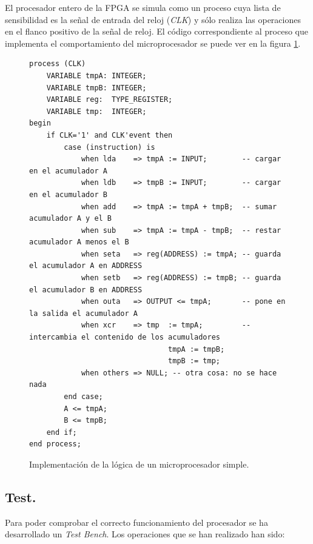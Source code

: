 \documentclass{article}
\begin{document}
El procesador entero de la FPGA se simula como un proceso cuya lista de sensibilidad es la señal de entrada del reloj (\emph{CLK}) y sólo realiza las operaciones en el flanco positivo de la señal de reloj. El código correspondiente al proceso que implementa el comportamiento del microprocesador se puede ver en la figura \ref{cod:p3:process}.

\begin{figure}[h]
	\begin{lstlisting}[style=vhdl]
process (CLK)
	VARIABLE tmpA: INTEGER;
	VARIABLE tmpB: INTEGER;
	VARIABLE reg:  TYPE_REGISTER;
	VARIABLE tmp:  INTEGER;
begin
	if CLK='1' and CLK'event then
		case (instruction) is
			when lda    => tmpA := INPUT;        -- cargar en el acumulador A
			when ldb    => tmpB := INPUT;        -- cargar en el acumulador B
			when add    => tmpA := tmpA + tmpB;  -- sumar acumulador A y el B
			when sub    => tmpA := tmpA - tmpB;  -- restar acumulador A menos el B
			when seta   => reg(ADDRESS) := tmpA; -- guarda el acumulador A en ADDRESS
			when setb   => reg(ADDRESS) := tmpB; -- guarda el acumulador B en ADDRESS
			when outa   => OUTPUT <= tmpA;       -- pone en la salida el acumulador A
			when xcr    => tmp  := tmpA;         -- intercambia el contenido de los acumuladores
								tmpA := tmpB;
								tmpB := tmp;
			when others => NULL; -- otra cosa: no se hace nada
		end case;
		A <= tmpA;
		B <= tmpB;
	end if;
end process;
	\end{lstlisting}
	\caption{Implementación de la lógica de un microprocesador simple.}
	\label{cod:p3:process}
\end{figure}

\subsection{Test.}

	Para poder comprobar el correcto funcionamiento del procesador se ha desarrollado un \emph{Test Bench}. Los operaciones que se han realizado han sido:
	
\end{document}
